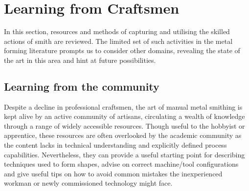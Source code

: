 





\newpage
\section{Learning from Craftsmen} \label{sec:Learning}


In this section, resources and methods of capturing and utilising the skilled actions of smith are reviewed. The limited set of such activities in the metal forming literature prompts us to consider other domains, revealing the state of the art in this area and hint at future possibilities. 

\subsection{Learning from the community \label{sec:LfC}}
Despite a decline in professional craftsmen, the art of manual metal smithing is kept alive by an active community of artisans, circulating a wealth of knowledge through a range of widely accessible resources. Though useful to the hobbyist or apprentice, these resources are often overlooked by the academic community as the content lacks in technical understanding and explicitly defined process capabilities. Nevertheless, they can provide a useful starting point for describing techniques used to form shapes, advise on correct machine/tool configurations and give useful tips on how to avoid common mistakes the inexperienced workman or newly commissioned technology might face.


